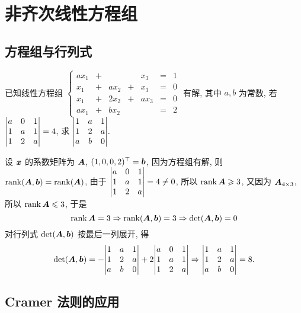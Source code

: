 \section{非齐次线性方程组}

\subsection{方程组与行列式}

\begin{example}
    已知线性方程组 $\left\{\begin{matrix}
            ax_1 & + &      &   & x_3  & = & 1 \\
            x_1  & + & ax_2 & + & x_3  & = & 0 \\
            x_1  & + & 2x_2 & + & ax_3 & = & 0 \\
            ax_1 & + & bx_2 &   &      & = & 2
        \end{matrix}\right.$ 有解, 其中 $a,b$ 为常数, 若 $\mqty|a&0&1\\1&a&1\\1&2&a|=4$, 求 $\mqty|1&a&1\\1&2&a\\a&b&0|.$
\end{example}
\begin{solution}
    设 $\vb*{x}$ 的系数矩阵为 $\vb*{A}$, $(1,0,0,2)^\top=\vb*{b}$, 因为方程组有解, 则 $\rank(\vb*{A},\vb*{b})=\rank(\vb*{A})$, 由于 $\mqty|a&0&1\\1&a&1\\1&2&a|=4\neq0$, 所以 $\rank\vb*{A}\geqslant 3$,
    又因为 $\vb*{A}_{4\times3}$, 所以 $\rank\vb*{A}\leqslant 3$, 于是 $$\rank\vb*{A}=3\Rightarrow \rank(\vb*{A},\vb*{b})=3\Rightarrow\det(\vb*{A},\vb*{b})=0$$
    对行列式 $\det(\vb*{A},\vb*{b})$ 按最后一列展开, 得
    $$\det(\vb*{A},\vb*{b})=-\mqty|1&a&1\\1&2&a\\a&b&0|+2\mqty|a&0&1\\1&a&1\\1&2&a|\Rightarrow\mqty|1&a&1\\1&2&a\\a&b&0|=8. $$
\end{solution}

\subsection{Cramer 法则的应用}

